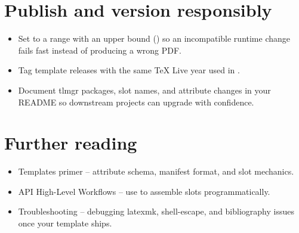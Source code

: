 \documentclass[a4paper,twoside]{article}
\begin{document}
\section{Publish and version responsibly}
\begin{itemize}
\item Set  to a range with an upper bound () so an incompatible runtime change fails fast instead of producing a wrong PDF.
\item Tag template releases with the same \TeX{} Live year used in .
\item Document tlmgr packages, slot names, and attribute changes in your README so downstream projects can upgrade with confidence.
\end{itemize}
\section{Further reading}
\begin{itemize}
\item Templates primer -- attribute schema, manifest format, and slot mechanics.
\item API High-Level Workflows -- use  to assemble slots programmatically.
\item Troubleshooting -- debugging latexmk, shell-escape, and bibliography issues once your template ships.
\end{itemize}
\end{document}
